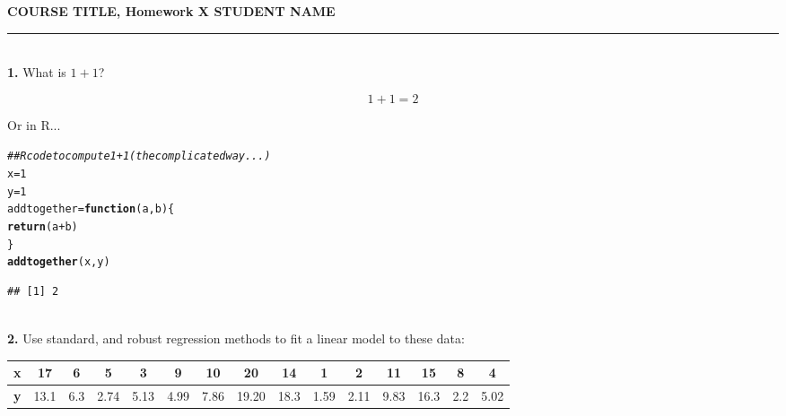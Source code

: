 \documentclass[11pt]{article}\usepackage[]{graphicx}\usepackage[]{color}
\makeatletter
\newcommand{\hlnum}[1]{\textcolor[rgb]{0.686,0.059,0.569}{#1}}%
\newcommand{\hlcom}[1]{\textcolor[rgb]{0.678,0.584,0.686}{\textit{#1}}}%
\newcommand{\hlopt}[1]{\textcolor[rgb]{0,0,0}{#1}}%
\newcommand{\hlstd}[1]{\textcolor[rgb]{0.345,0.345,0.345}{#1}}%
\newcommand{\hlkwa}[1]{\textcolor[rgb]{0.161,0.373,0.58}{\textbf{#1}}}%
\newcommand{\hlkwb}[1]{\textcolor[rgb]{0.69,0.353,0.396}{#1}}%
\newcommand{\hlkwc}[1]{\textcolor[rgb]{0.333,0.667,0.333}{#1}}%
\newcommand{\hlkwd}[1]{\textcolor[rgb]{0.737,0.353,0.396}{\textbf{#1}}}%
\newenvironment{kframe}{%
 \def\at@end@of@kframe{}%
 \ifinner\ifhmode%
  \def\at@end@of@kframe{\end{minipage}}%
  \begin{minipage}{\columnwidth}%
 \fi\fi%
 \def\FrameCommand##1{\hskip\@totalleftmargin \hskip-\fboxsep
 \colorbox{shadecolor}{##1}\hskip-\fboxsep
     \hskip-\linewidth \hskip-\@totalleftmargin \hskip\columnwidth}%
 \MakeFramed {\advance\hsize-\width
   \@totalleftmargin\z@ \linewidth\hsize
   \@setminipage}}%
 {\par\unskip\endMakeFramed%
 \at@end@of@kframe}
\newenvironment{knitrout}{}{} %
\makeatother
\begin{document}


\textbf{\large COURSE TITLE, Homework X \hfill STUDENT NAME}  %
\vspace{1pt}
\hrule
~\\ %

\textbf{1.} What is $1+1$? 

$$1+1=2$$

Or in R... %
\begin{knitrout}\footnotesize
{}\color{fgcolor}\begin{kframe}
\begin{alltt}
\hlcom{## R code to compute 1+1 (the complicated way...)}
\hlstd{x} \hlkwb{=} \hlnum{1}
\hlstd{y} \hlkwb{=} \hlnum{1}
\hlstd{addtogether} \hlkwb{=} \hlkwa{function}\hlstd{(}\hlkwc{a}\hlstd{,} \hlkwc{b}\hlstd{) \{}
    \hlkwd{return}\hlstd{(a} \hlopt{+} \hlstd{b)}
\hlstd{\}}
\hlkwd{addtogether}\hlstd{(x, y)}
\end{alltt}
\begin{verbatim}
## [1] 2
\end{verbatim}
\end{kframe}
\end{knitrout}
~\\

\textbf{2.} Use standard, and robust regression methods to fit a linear model to these data:

\begin{table}[h!]  \begin{center}
 \begin{tabular}{c|cccccccccccccc}
\textbf{x} & 17 & 6 & 5 & 3 & 9 & 10 & 20 & 14 & 1 & 2 & 11 & 15 & 8 & 4 \\ \hline
\textbf{y} & 13.1& 6.3& 2.74& 5.13& 4.99& 7.86& 19.20& 18.3& 1.59& 2.11& 9.83& 16.3& 2.2& 5.02 \\
 \end{tabular}  \end{center}
\end{table}
\end{document}
